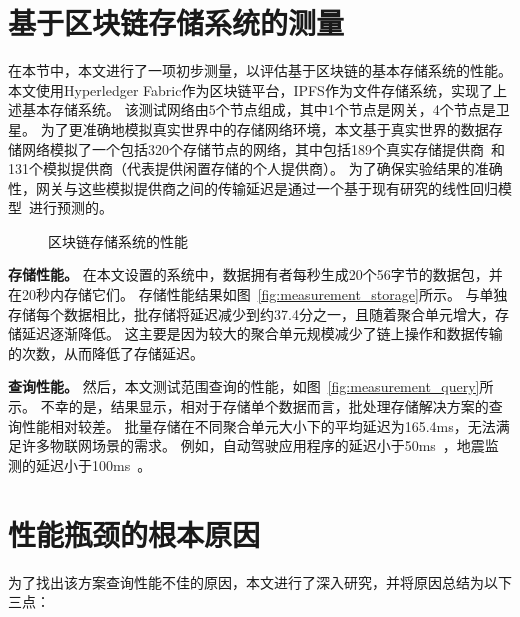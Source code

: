 \section{基于区块链存储系统的测量}
在本节中，本文进行了一项初步测量，以评估基于区块链的基本存储系统的性能。
本文使用Hyperledger Fabric作为区块链平台，IPFS作为文件存储系统，实现了上述基本存储系统。
该测试网络由5个节点组成，其中1个节点是网关，4个节点是卫星。
为了更准确地模拟真实世界中的存储网络环境，本文基于真实世界的数据存储网络模拟了一个包括320个存储节点的网络，其中包括189个真实存储提供商~\cite{corneo2021surrounded}和131个模拟提供商（代表提供闲置存储的个人提供商）。
为了确保实验结果的准确性，网关与这些模拟提供商之间的传输延迟是通过一个基于现有研究的线性回归模型~\cite{ziviani2005improving}进行预测的。
\begin{figure*}[t]
    \centering
    \begin{minipage}{1\linewidth}
	    \centering
        \hfill
        \caption{区块链存储系统的性能} 
    \end{minipage}
\end{figure*}

\textbf{存储性能。}
在本文设置的系统中，数据拥有者每秒生成20个56字节的数据包，并在20秒内存储它们。
存储性能结果如图~\autoref{fig:measurement_storage}所示。
与单独存储每个数据相比，批存储将延迟减少到约37.4分之一，且随着聚合单元增大，存储延迟逐渐降低。
这主要是因为较大的聚合单元规模减少了链上操作和数据传输的次数，从而降低了存储延迟。

\textbf{查询性能。}
然后，本文测试范围查询的性能，如图~\autoref{fig:measurement_query}所示。
不幸的是，结果显示，相对于存储单个数据而言，批处理存储解决方案的查询性能相对较差。
批量存储在不同聚合单元大小下的平均延迟为165.4ms，无法满足许多物联网场景的需求。
例如，自动驾驶应用程序的延迟小于50ms~\cite{caesar2020nuscenes}，地震监测的延迟小于100ms~\cite{bhatia2023artificial}。

\section{性能瓶颈的根本原因}
为了找出该方案查询性能不佳的原因，本文进行了深入研究，并将原因总结为以下三点：

